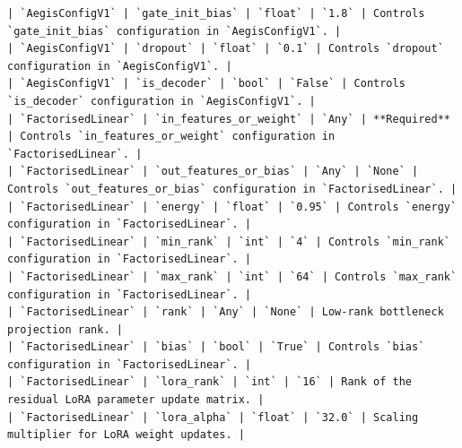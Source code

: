 \begin{verbatim}
| `AegisConfigV1` | `gate_init_bias` | `float` | `1.8` | Controls `gate_init_bias` configuration in `AegisConfigV1`. |
| `AegisConfigV1` | `dropout` | `float` | `0.1` | Controls `dropout` configuration in `AegisConfigV1`. |
| `AegisConfigV1` | `is_decoder` | `bool` | `False` | Controls `is_decoder` configuration in `AegisConfigV1`. |
| `FactorisedLinear` | `in_features_or_weight` | `Any` | **Required** | Controls `in_features_or_weight` configuration in `FactorisedLinear`. |
| `FactorisedLinear` | `out_features_or_bias` | `Any` | `None` | Controls `out_features_or_bias` configuration in `FactorisedLinear`. |
| `FactorisedLinear` | `energy` | `float` | `0.95` | Controls `energy` configuration in `FactorisedLinear`. |
| `FactorisedLinear` | `min_rank` | `int` | `4` | Controls `min_rank` configuration in `FactorisedLinear`. |
| `FactorisedLinear` | `max_rank` | `int` | `64` | Controls `max_rank` configuration in `FactorisedLinear`. |
| `FactorisedLinear` | `rank` | `Any` | `None` | Low-rank bottleneck projection rank. |
| `FactorisedLinear` | `bias` | `bool` | `True` | Controls `bias` configuration in `FactorisedLinear`. |
| `FactorisedLinear` | `lora_rank` | `int` | `16` | Rank of the residual LoRA parameter update matrix. |
| `FactorisedLinear` | `lora_alpha` | `float` | `32.0` | Scaling multiplier for LoRA weight updates. |
\end{verbatim}